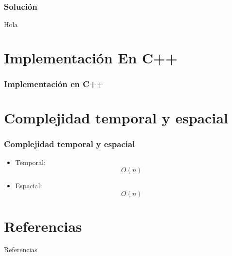 \documentclass[17pt, t, lualatex]{beamer}
\begin{document}
\insertsectionpage

\begin{frame}
  \frametitle{Solución}


  Hola


\end{frame}


\section{Implementación En C++}

\insertsectionpage

\begin{frame}
  \frametitle{Implementación en C++}


\end{frame}

\section{Complejidad temporal y espacial}

\insertsectionpage

\begin{frame}
  \frametitle{Complejidad temporal y espacial}

  \begin{itemize}
    \item Temporal:
          \[O(n)\]
    \item Espacial:
          \[O(n)\]
  \end{itemize}

\end{frame}





\section{Referencias}

\insertsectionpage
\begin{frame}[allowframebreaks]{Referencias}
  \printbibliography
\end{frame}


\insertendpage
\end{document}
